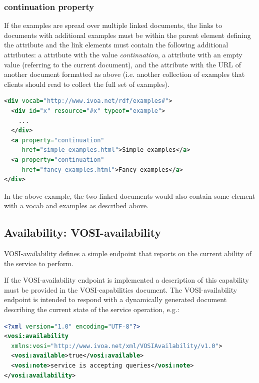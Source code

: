 \documentclass[11pt,letter]{ivoa}
\begin{document}
\subsubsection{continuation property}

If the examples are spread over multiple linked documents, the links to
documents with additional examples must be within the parent element defining
the  attribute and the link elements must contain the following additional
attributes:  a  attribute with the value
\emph{continuation}, a 
attribute with an empty value (referring to the current document), and
the 
attribute with the URL of another document formatted as above (i.e. another
collection of examples that clients should read to collect the full set of
examples).

\begin{lstlisting}[language=XML,basicstyle=\footnotesize]
<div vocab="http://www.ivoa.net/rdf/examples#">
  <div id="x" resource="#x" typeof="example">
    ...
  </div>
  <a property="continuation"
     href="simple_examples.html">Simple examples</a>
  <a property="continuation"
     href="fancy_examples.html">Fancy examples</a>
</div>
\end{lstlisting}

In the above example, the two linked documents would also contain some element
with a vocab and examples as described above.

\subsection{Availability: VOSI-availability}
\label{sec:vosi-availability}
VOSI-availability \citep{2017ivoa.spec.0524G} defines a simple endpoint that
reports on the current ability of the service to perform.

If the VOSI-availability endpoint is implemented a description
of this capability must be provided in the VOSI-capabilities document.
The VOSI-availability endpoint is
intended to respond with a dynamically generated document describing the current state of the service
operation, e.g.:

\begin{lstlisting}[language=XML,basicstyle=\footnotesize]
<?xml version="1.0" encoding="UTF-8"?>
<vosi:availability
  xmlns:vosi="http://www.ivoa.net/xml/VOSIAvailability/v1.0">
  <vosi:available>true</vosi:available>
  <vosi:note>service is accepting queries</vosi:note>
</vosi:availability>
\end{lstlisting}
\end{document}
